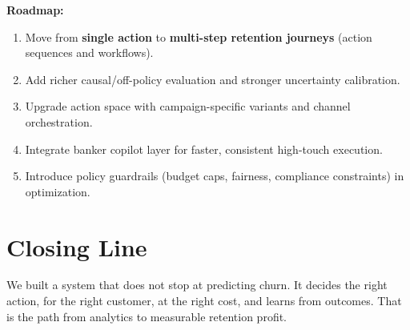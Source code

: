 \documentclass[11pt,a4paper]{article}
\begin{document}
\textbf{Roadmap:}
\begin{enumerate}
    \item Move from \textbf{single action} to \textbf{multi-step retention journeys} (action sequences and workflows).
    \item Add richer causal/off-policy evaluation and stronger uncertainty calibration.
    \item Upgrade action space with campaign-specific variants and channel orchestration.
    \item Integrate banker copilot layer for faster, consistent high-touch execution.
    \item Introduce policy guardrails (budget caps, fairness, compliance constraints) in optimization.
\end{enumerate}

\section*{Closing Line}
We built a system that does not stop at predicting churn. It decides the right action, for the right customer, at the right cost, and learns from outcomes. That is the path from analytics to measurable retention profit.
\end{document}
